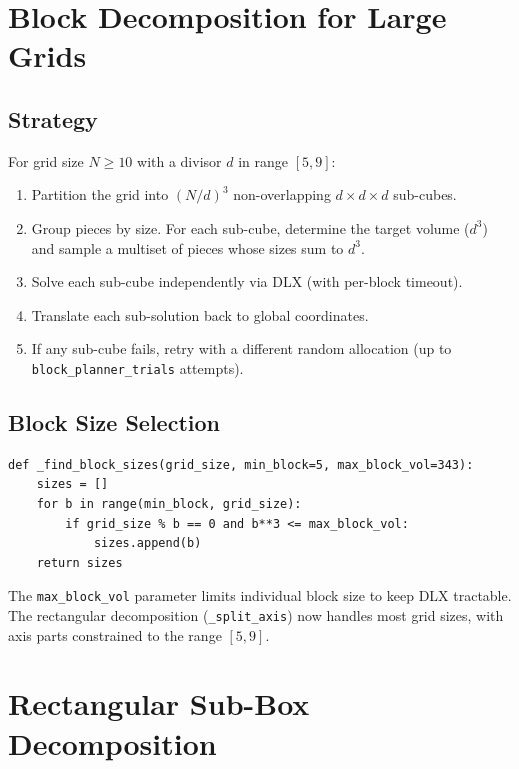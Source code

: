 \documentclass[11pt]{article}
\begin{document}
\section{Block Decomposition for Large Grids}

\subsection{Strategy}

For grid size $N \geq 10$ with a divisor $d$ in range $[5, 9]$:

\begin{enumerate}[nosep]
  \item Partition the grid into $(N/d)^3$ non-overlapping $d \times d \times d$ sub-cubes.
  \item Group pieces by size. For each sub-cube, determine the target volume ($d^3$) and sample a multiset of pieces whose sizes sum to $d^3$.
  \item Solve each sub-cube independently via DLX (with per-block timeout).
  \item Translate each sub-solution back to global coordinates.
  \item If any sub-cube fails, retry with a different random allocation (up to \texttt{block\_planner\_trials} attempts).
\end{enumerate}

\subsection{Block Size Selection}

\begin{lstlisting}
def _find_block_sizes(grid_size, min_block=5, max_block_vol=343):
    sizes = []
    for b in range(min_block, grid_size):
        if grid_size % b == 0 and b**3 <= max_block_vol:
            sizes.append(b)
    return sizes
\end{lstlisting}

The \texttt{max\_block\_vol} parameter limits individual block size to keep DLX tractable. The rectangular decomposition (\texttt{\_split\_axis}) now handles most grid sizes, with axis parts constrained to the range $[5, 9]$.

\section{Rectangular Sub-Box Decomposition}
\end{document}
